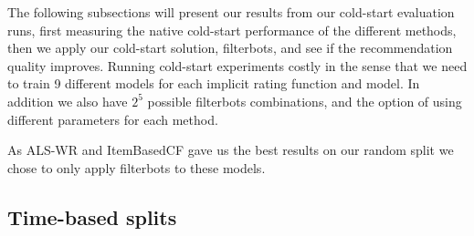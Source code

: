 The following subsections will present our results from our cold-start evaluation runs, first measuring the native cold-start performance
of the different methods, then we apply our cold-start solution, filterbots, and see if the recommendation quality improves.
Running cold-start experiments costly in the sense that we need to train 9 different models for each implicit rating function and model.
In addition we also have $2^5$ possible filterbots combinations, and the option of using different parameters for each method.

As ALS-WR and ItemBasedCF gave us the best results on our random split we chose to only apply filterbots to these models.



\subsection{Time-based splits}


\begin{table}[H]
\centering
{}
\caption{Cold-start item results - time splits}
\end{table}

